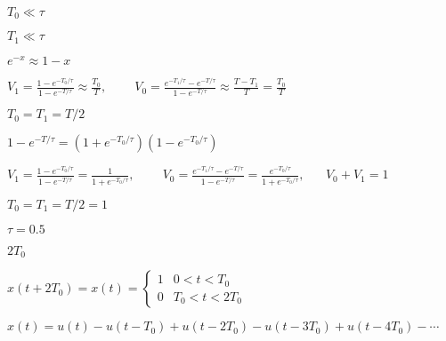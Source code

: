 \documentclass{article}
\def\lthtmlcheckvsize{\ifdim\ht\sizebox<\vsize 
  \ifdim\wd\sizebox<\hsize\expandafter\hfill\fi \expandafter\vfill
  \else\expandafter\vss\fi}%
\begin{document}
{\newpage\clearpage
{}%
$ T_0\ll\tau$%
\lthtmlindisplaymathZ
\lthtmlcheckvsize\clearpage}

{\newpage\clearpage
{}%
$ T_1\ll\tau$%
\lthtmlindisplaymathZ
\lthtmlcheckvsize\clearpage}

{\newpage\clearpage
{}%
$ e^{-x}\approx 1-x$%
\lthtmlindisplaymathZ
\lthtmlcheckvsize\clearpage}

{\newpage\clearpage
{}%
$\displaystyle V_1=\frac{1-e^{-T_0/\tau}}{1-e^{-T/\tau}}\approx\frac{T_0}{T},  \;\;\;\;\;\;\;\;
V_0=\frac{e^{-T_1/\tau}-e^{-T/\tau}}{1-e^{-T/\tau}}\approx\frac{T-T_1}{T}=\frac{T_0}{T}$%
\lthtmlindisplaymathZ
\lthtmlcheckvsize\clearpage}

{\newpage\clearpage
{}%
$ T_0=T_1=T/2$%
\lthtmlindisplaymathZ
\lthtmlcheckvsize\clearpage}

{\newpage\clearpage
{}%
$\displaystyle 1-e^{-T/\tau}=(1+e^{-T_0/\tau})(1-e^{-T_0/\tau})$%
\lthtmlindisplaymathZ
\lthtmlcheckvsize\clearpage}

{\newpage\clearpage
{}%
$\displaystyle V_1=\frac{1-e^{-T_0/\tau}}{1-e^{-T/\tau}}=\frac{1}{1+e^{-T_0/\tau}},
\;\;\;\;\;\;\;\;
V_0=\frac{e^{-T_1/\tau}-e^{-T/\tau}}{1-e^{-T/\tau}}=\frac{e^{-T_0/\tau}}{1+e^{-T_0/\tau}},
\;\;\;\;\;\;V_0+V_1=1$%
\lthtmlindisplaymathZ
\lthtmlcheckvsize\clearpage}

{\newpage\clearpage
{}%
$ T_0=T_1=T/2=1$%
\lthtmlindisplaymathZ
\lthtmlcheckvsize\clearpage}

{\newpage\clearpage
{}%
$ \tau=0.5$%
\lthtmlindisplaymathZ
\lthtmlcheckvsize\clearpage}

{\newpage\clearpage
{}%
$ 2T_0$%
\lthtmlindisplaymathZ
\lthtmlcheckvsize\clearpage}

{\newpage\clearpage
{}%
$\displaystyle x(t+2T_0)=x(t)=\left\{ \begin{array}{cl}1&0<t<T_0\\0&T_0<t<2T_0\end{array}\right.$%
\lthtmlindisplaymathZ
\lthtmlcheckvsize\clearpage}

{\newpage\clearpage
{}%
$\displaystyle x(t)=u(t)-u(t-T_0)+u(t-2T_0)-u(t-3T_0)+u(t-4T_0)- \cdots$%
\lthtmlindisplaymathZ
\lthtmlcheckvsize\clearpage}
\end{document}
